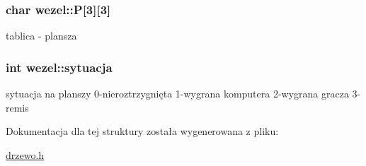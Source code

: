 \subsubsection[{\texorpdfstring{P}{P}}]{\setlength{\rightskip}{0pt plus 5cm}char wezel\+::P\mbox{[}3\mbox{]}\mbox{[}3\mbox{]}}\hypertarget{structwezel_af8b190ce1c018baaf3d6b29c8b1703ca}{}\label{structwezel_af8b190ce1c018baaf3d6b29c8b1703ca}


tablica -\/ plansza 

\subsubsection[{\texorpdfstring{sytuacja}{sytuacja}}]{\setlength{\rightskip}{0pt plus 5cm}int wezel\+::sytuacja}\hypertarget{structwezel_a87379e5872e2a13715421baec8dae5cf}{}\label{structwezel_a87379e5872e2a13715421baec8dae5cf}


sytuacja na planszy 0-\/nieroztrzygnięta 1-\/wygrana komputera 2-\/wygrana gracza 3-\/remis 



Dokumentacja dla tej struktury została wygenerowana z pliku\+:\begin{DoxyCompactItemize}
\item 
\hyperlink{drzewo_8h}{drzewo.\+h}\end{DoxyCompactItemize}
